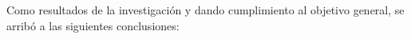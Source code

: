 \conclusions
Como resultados de la investigación y dando cumplimiento al objetivo general, se arribó a las siguientes conclusiones:
